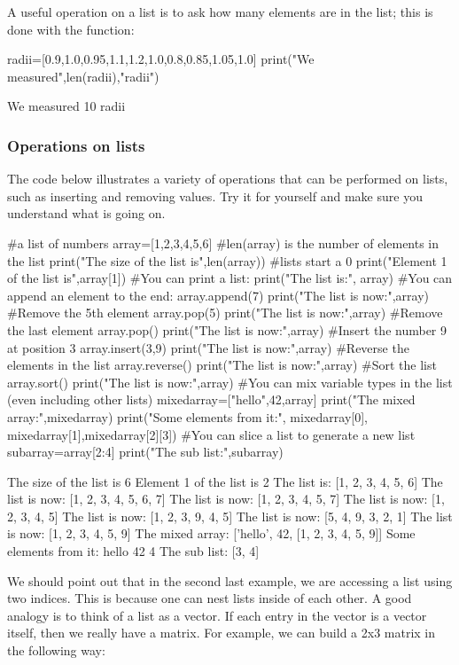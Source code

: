 A useful operation on a list is to ask how many elements are in the list; this is done with the  function:
\begin{python}[caption = \mbox{}]
radii=[0.9,1.0,0.95,1.1,1.2,1.0,0.8,0.85,1.05,1.0]
print("We measured",len(radii),"radii")
\end{python}
\begin{poutput}
We measured 10 radii
\end{poutput}

\subsubsection{Operations on lists}
The code below illustrates a variety of operations that can be performed on lists, such as inserting and removing values. Try it for yourself and make sure you understand what is going on.
\begin{python}[caption = \mbox{}]
#a list of numbers
array=[1,2,3,4,5,6]
#len(array) is the number of elements in the list
print("The size of the list is",len(array))
#lists start a 0
print("Element 1 of the list is",array[1])
#You can print a list:
print("The list is:", array)
#You can append an element to the end:
array.append(7)
print("The list is now:",array)
#Remove the 5th element
array.pop(5)
print("The list is now:",array)
#Remove the last element
array.pop()
print("The list is now:",array)
#Insert the number 9 at position 3
array.insert(3,9)
print("The list is now:",array)
#Reverse the elements in the list
array.reverse()
print("The list is now:",array)
#Sort the list
array.sort()
print("The list is now:",array)
#You can mix variable types in the list (even including other lists)
mixedarray=["hello",42,array]
print("The mixed array:",mixedarray)
print("Some elements from it:", mixedarray[0],
      mixedarray[1],mixedarray[2][3])
#You can slice a list to generate a new list
subarray=array[2:4]
print("The sub list:",subarray)
\end{python}
\begin{poutput}
The size of the list is 6
Element 1 of the list is 2
The list is: [1, 2, 3, 4, 5, 6]
The list is now: [1, 2, 3, 4, 5, 6, 7]
The list is now: [1, 2, 3, 4, 5, 7]
The list is now: [1, 2, 3, 4, 5]
The list is now: [1, 2, 3, 9, 4, 5]
The list is now: [5, 4, 9, 3, 2, 1]
The list is now: [1, 2, 3, 4, 5, 9]
The mixed array: ['hello', 42, [1, 2, 3, 4, 5, 9]]
Some elements from it: hello 42 4
The sub list: [3, 4]
\end{poutput}
We should point out that in the second last example, we are accessing a list using two indices. This is because one can nest lists inside of each other. A good analogy is to think of a list as a vector. If each entry in the vector is a vector itself, then we really have a matrix. For example, we can build a 2x3 matrix in the following way:
